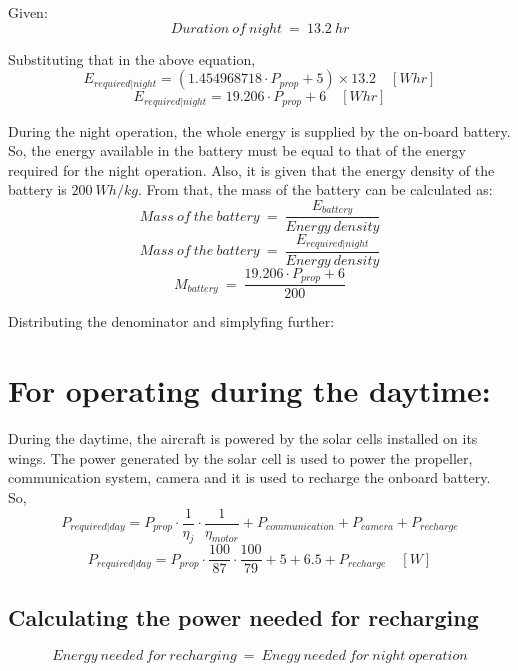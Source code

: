 Given:
\[ Duration \ of \ night \ = \ 13.2 \ hr \]

Substituting that in the above equation,
\[ E_{required | night} = (1.454968718 \cdot P_{prop} + 5) \times 13.2 \quad [Whr] \]
\[ E_{required | night} = 19.206 \cdot P_{prop} + 6 \quad [Whr] \]

\p During the night operation, the whole energy is supplied by the on-board battery. So, the energy available in the battery must be equal to that of the energy required for the night operation. Also, it is given that the energy density of the battery is $ 200 \ Wh/kg $. From that, the mass of the battery can be calculated as:
\[ Mass \ of \ the \ battery \ = \ \frac{ E_{battery} }{ Energy \ density } \]
\[ Mass \ of \ the \ battery \ = \ \frac{ E_{required | night} }{ Energy \ density } \]
\[ M_{battery} \ = \ \frac{ 19.206 \cdot P_{prop} + 6 }{ 200 } \]

Distributing the denominator and simplyfing further:

\section{For operating during the daytime:}

\p During the daytime, the aircraft is powered by the solar cells installed on its wings. The power generated by the solar cell is used to power the propeller, communication system, camera and it is used to recharge the onboard battery. \\
\p So,
\[ P_{required|day} = P_{prop} \cdot \frac{1}{\eta_j} \cdot \frac{1}{\eta_{motor}} + P_{communication} + P_{camera} + P_{recharge} \]
\[ P_{required|day} = P_{prop} \cdot \frac{100}{87} \cdot \frac{100}{79} + 5 + 6.5 + P_{recharge} \quad [W] \]


\subsection{Calculating the power needed for recharging}
\vspace{0.2cm}

\[ Energy \ needed \ for \ recharging \ = \ Enegy \ needed \ for \ night \ operation \]


